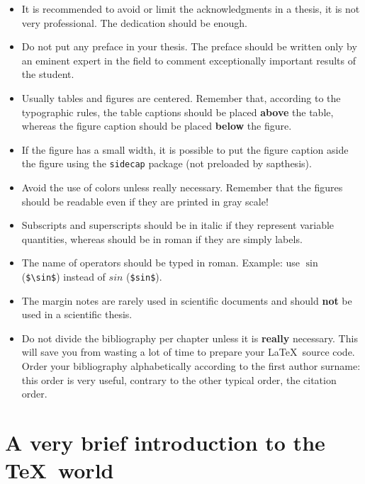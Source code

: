 \documentclass[a5paper,11pt]{article}
\newcommand{\bs}{\textbackslash}
\begin{document}
\begin{itemize}
\item It is recommended to avoid or limit the acknowledgments in a thesis, it 
is not very professional. The dedication should be enough.

\item Do not put any preface in your thesis. The preface should be written only by an eminent expert in the field to comment exceptionally important results of the student.

\item Usually tables and figures are centered. Remember that, according to the typographic rules, the table captions should be placed \textbf{above} the table, whereas the figure caption should be placed \textbf{below} the figure.

\item If the figure has a small width, it is possible to put the figure caption
aside the figure using the \texttt{sidecap} package (not preloaded by \textsf{sapthesis}).

\item Avoid the use of colors unless really necessary. Remember that the figures should be readable even if they are printed in gray scale!

\item Subscripts and superscripts should be in italic if they represent variable quantities, whereas should be in roman if they are simply labels.

\item The name of operators should be typed in roman. Example: use $\sin$ (\texttt{\$\bs sin\$}) instead of $sin$ (\texttt{\$sin\$}).

\item The margin notes are rarely used in scientific documents and should \textbf{not} be used in a scientific thesis.

\item Do not divide the bibliography per chapter unless it is \textbf{really} necessary.
This will save you from wasting a lot of time to prepare your \LaTeX\ source code.
Order your bibliography alphabetically according to the
first author surname: this order is very useful, contrary to the other typical order, the citation order.

\end{itemize}


\appendix

\section{A very brief introduction to the \TeX\ world}
\end{document}
